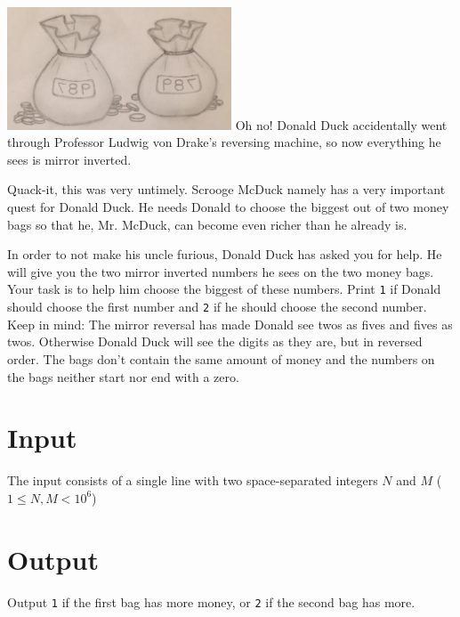 \includegraphics[width=0.5\textwidth]{moneybags.jpg}
Oh no! Donald Duck accidentally went through Professor Ludwig von Drake’s reversing machine, so now everything he sees is mirror inverted.

Quack-it, this was very untimely. Scrooge McDuck namely has a very important quest for Donald Duck. He needs Donald to choose the biggest out of two money bags so that he, Mr. McDuck, can become even richer than he already is.

In order to not make his uncle furious, Donald Duck has asked you for help. He will give you the two
mirror inverted numbers he sees on the two money bags. Your task is to help him choose the biggest
of these numbers. Print \texttt{1} if Donald should choose the first number and \texttt{2} if he should choose the
second number. Keep in mind: The mirror reversal has made Donald see twos as fives and fives as twos.
Otherwise Donald Duck will see the digits as they are, but in reversed order. The bags don't
contain the same amount of money and the numbers on the bags neither start nor end with a zero.

\section*{Input}
The input consists of a single line with two space-separated integers $N$ and $M$ ($1
\leq N, M < 10^6$)

\section*{Output}
Output \texttt{1} if the first bag has more money, or \texttt{2} if the second bag has more.
